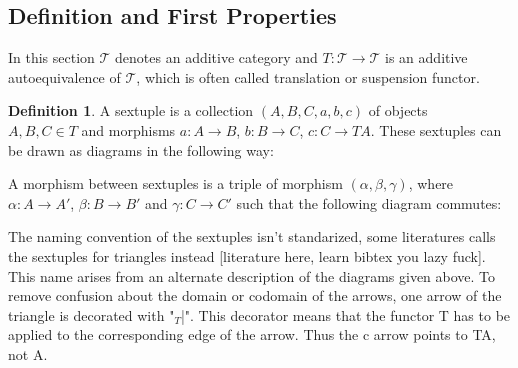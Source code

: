 \documentclass[12pt]{article}
\theoremstyle{definition}
\newtheorem{definition}{Definition}[section]
\theoremstyle{remark}
\begin{document}
        \subsection{Definition and First Properties}
            In this section $\mathcal{T}$ denotes an additive category and $T:\mathcal{T}\rightarrow\mathcal{T}$ is an additive autoequivalence of $\mathcal{T}$, which is often called translation or suspension functor.
            \begin{definition}
                A sextuple is a collection $(A,B,C,a,b,c)$ of objects \\ $A,B,C\in T$ and morphisms $a:A\rightarrow B$, $b:B\rightarrow C$, $c:C\rightarrow TA$. These sextuples can be drawn as diagrams in the following way:

                \begin{center}
                \end{center}

                A morphism between sextuples is a triple of morphism $(\alpha, \beta, \gamma)$, where $\alpha : A \rightarrow A'$, $\beta : B \rightarrow B'$ and $\gamma : C \rightarrow C'$ such that the following diagram commutes:

            \begin{center}
            \end{center}

            \end{definition}

            The naming convention of the sextuples isn't standarized, some literatures calls the sextuples for triangles instead [literature here, learn bibtex you lazy fuck]. This name arises from an alternate description of the diagrams given above. To remove confusion about the domain or codomain of the arrows, one arrow of the triangle is decorated with "$_T$|". This decorator means that the functor T has to be applied to the corresponding edge of the arrow. Thus the c arrow points to TA, not A.
\end{document}
